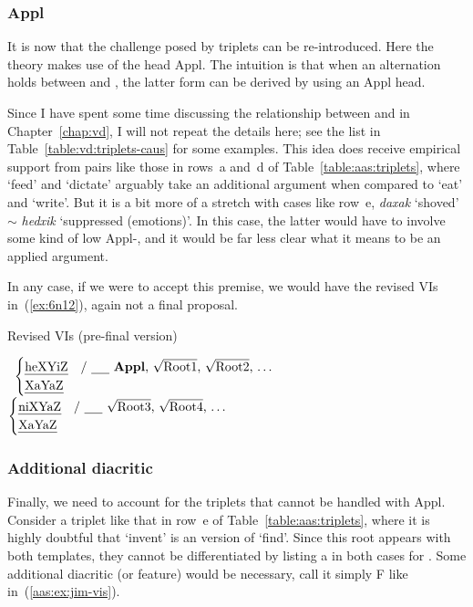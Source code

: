 \begin{exe}
\begin{xlist}
\begin{exe}
\begin{exe}
\begin{xlist}
\begin{exe}
\begin{exe}
\begin{exe}
\begin{exe}
\begin{exe}
\begin{xlist}
\begin{exe}
\begin{exe}
\begin{xlist}
\begin{exe}
\begin{xlist}
		\subsubsection{Appl}
It is now that the challenge posed by triplets can be re-introduced. Here the theory makes use of the  head Appl. The intuition is that when an alternation holds between {\tkal} and {\thif}, the latter form can be derived by using an Appl head.

Since I have spent some time discussing the relationship between {\tkal} and {\thif} in Chapter~\ref{chap:vd}, I will not repeat the details here; see the list in Table~\ref{table:vd:triplets-caus} for some examples. This idea does receive empirical support from pairs like those in rows~a and~d of Table~\ref{table:aas:triplets}, where `feed' and `dictate' arguably take an additional argument when compared to `eat' and `write'. But it is a bit more of a stretch with cases like row~e, \emph{daxak} `shoved' $\sim$ \emph{hedxik} `suppressed (emotions)'. In this case, the latter would have to involve some kind of low Appl-, and it would be far less clear what it means to be an applied argument.

In any case, if we were to accept this premise, we would have the revised VIs in~(\ref{ex:6n12}), again not a final proposal.

 \begin{exe}
 \ex  \label{ex:6n12}Revised VIs (pre-final version) 
 \begin{xlist} 
 	\ex  {\vds} \lra~$\begin{cases} 
		\text{\thif} & \text{/ \trace~\textbf{Appl}, \root{Root1}, \root{Root2}, \dots}\\
		\text{\tkal} & \\
		\end{cases}$
 	\ex  {\vzs} \lra~$\begin{cases} 
		\text{\tnif} & \text{/ \trace~\root{Root3}, \root{Root4}, \dots}\\
		\text{\tkal} & \\
		\end{cases}$
 \z
\z 

		\subsubsection{Additional diacritic}
Finally, we need to account for the triplets that cannot be handled with Appl. Consider a triplet like that in row~e of Table~\ref{table:aas:triplets}, where it is highly doubtful that `invent' is an  version of `find'. Since this root appears with both templates, they cannot be differentiated by listing a  in both cases for {\vds}. Some additional diacritic (or feature) would be necessary, call it simply F like in~(\ref{aas:ex:jim-vis}).


\end{xlist}
\end{exe}
\end{xlist}
\end{exe}
\end{xlist}
\end{exe}
\end{exe}
\end{xlist}
\end{exe}
\end{exe}
\end{exe}
\end{exe}
\end{exe}
\end{xlist}
\end{exe}
\end{exe}
\end{xlist}
\end{exe}
